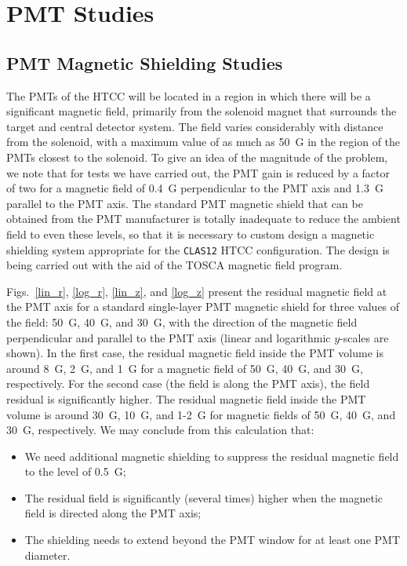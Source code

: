 \section{PMT Studies}

\subsection{PMT Magnetic Shielding Studies}

The PMTs of the HTCC will be located in a region in which there will 
be a significant magnetic field, primarily from the solenoid magnet 
that surrounds the target and central detector system.  The field 
varies considerably with distance from the solenoid, with a maximum 
value of as much as 50~G in the region of the PMTs closest to the 
solenoid.  To give an idea of the magnitude of the problem, we note 
that for tests we have carried out, the PMT gain is reduced by a factor
of two for a magnetic field of 0.4~G perpendicular to the PMT axis    
and 1.3~G parallel to the PMT axis.  The standard PMT magnetic shield 
that can be obtained from the PMT manufacturer is totally inadequate to 
reduce the ambient field to even these levels, so that it is necessary 
to custom design a magnetic shielding system appropriate for the
{\tt CLAS12} HTCC configuration.  The design is being carried out with 
the aid of the TOSCA magnetic field program. 

Figs.~\ref{lin_r}, \ref{log_r}, \ref{lin_z}, and \ref{log_z} present the 
residual magnetic field at the PMT axis for a standard single-layer PMT 
magnetic shield for three values of the field: 50~G, 40~G, and 30~G, 
with the direction of the magnetic field perpendicular and parallel to the 
PMT axis (linear and logarithmic $y$-scales are shown).  In the first 
case, the residual magnetic field inside the PMT volume is around 8~G, 
2~G, and 1~G for a magnetic field of 50~G, 40~G, and 30~G, respectively. 
For the second case (the field is along the PMT axis), the field residual 
is significantly higher.  The residual magnetic field inside the PMT volume 
is around 30~G, 10~G, and 1-2~G for magnetic fields of 50~G, 40~G, and 
30~G, respectively.  We may conclude from this calculation that:

\begin{itemize}
\item We need additional magnetic shielding to suppress the residual 
magnetic field to the level of 0.5~G;
\item The residual field is significantly (several times) higher when 
the magnetic field is directed along the PMT axis;
\item The shielding needs to extend beyond the PMT window for at least 
one PMT diameter.
\end{itemize}

